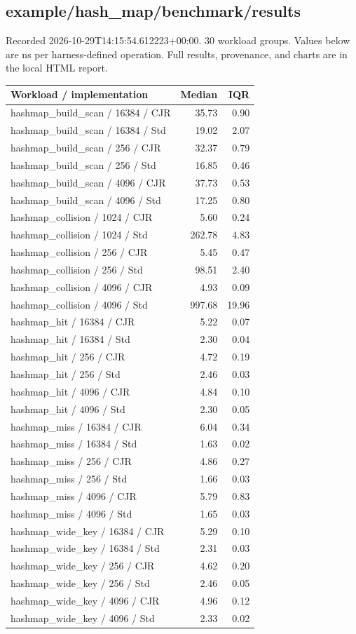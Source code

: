 \subsection{example/hash\_map/benchmark/results}
Recorded 2026-10-29T14:15:54.612223+00:00. 30 workload groups. Values below are ns per harness-defined operation. Full results, provenance, and charts are in the local HTML report.
\begin{longtable}{p{}rr}Workload / implementation & Median & IQR \\ \hline
hashmap\_build\_scan / 16384 / CJR & 35.73 & 0.90 \\
hashmap\_build\_scan / 16384 / Std & 19.02 & 2.07 \\
hashmap\_build\_scan / 256 / CJR & 32.37 & 0.79 \\
hashmap\_build\_scan / 256 / Std & 16.85 & 0.46 \\
hashmap\_build\_scan / 4096 / CJR & 37.73 & 0.53 \\
hashmap\_build\_scan / 4096 / Std & 17.25 & 0.80 \\
hashmap\_collision / 1024 / CJR & 5.60 & 0.24 \\
hashmap\_collision / 1024 / Std & 262.78 & 4.83 \\
hashmap\_collision / 256 / CJR & 5.45 & 0.47 \\
hashmap\_collision / 256 / Std & 98.51 & 2.40 \\
hashmap\_collision / 4096 / CJR & 4.93 & 0.09 \\
hashmap\_collision / 4096 / Std & 997.68 & 19.96 \\
hashmap\_hit / 16384 / CJR & 5.22 & 0.07 \\
hashmap\_hit / 16384 / Std & 2.30 & 0.04 \\
hashmap\_hit / 256 / CJR & 4.72 & 0.19 \\
hashmap\_hit / 256 / Std & 2.46 & 0.03 \\
hashmap\_hit / 4096 / CJR & 4.84 & 0.10 \\
hashmap\_hit / 4096 / Std & 2.30 & 0.05 \\
hashmap\_miss / 16384 / CJR & 6.04 & 0.34 \\
hashmap\_miss / 16384 / Std & 1.63 & 0.02 \\
hashmap\_miss / 256 / CJR & 4.86 & 0.27 \\
hashmap\_miss / 256 / Std & 1.66 & 0.03 \\
hashmap\_miss / 4096 / CJR & 5.79 & 0.83 \\
hashmap\_miss / 4096 / Std & 1.65 & 0.03 \\
hashmap\_wide\_key / 16384 / CJR & 5.29 & 0.10 \\
hashmap\_wide\_key / 16384 / Std & 2.31 & 0.03 \\
hashmap\_wide\_key / 256 / CJR & 4.62 & 0.20 \\
hashmap\_wide\_key / 256 / Std & 2.46 & 0.05 \\
hashmap\_wide\_key / 4096 / CJR & 4.96 & 0.12 \\
hashmap\_wide\_key / 4096 / Std & 2.33 & 0.02 \\
\end{longtable}
